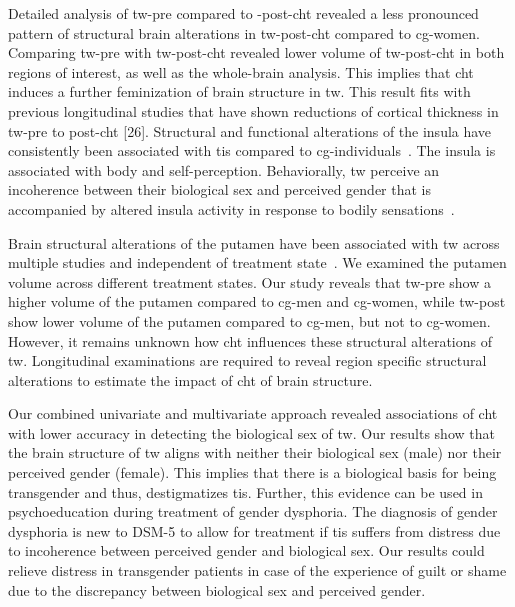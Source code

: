 \documentclass{article}
\begin{document}
    Detailed analysis of \ac{tw}-pre compared to -post-\ac{cht} revealed a less pronounced pattern of structural brain alterations in \ac{tw}-post-\ac{cht} compared to \ac{cg}-women. Comparing \ac{tw}-pre with \ac{tw}-post-\ac{cht} revealed lower volume of \ac{tw}-post-\ac{cht} in both regions of interest, as well as the whole-brain analysis. This implies that \ac{cht} induces a further feminization of brain structure in \ac{tw}. This result fits with previous longitudinal studies that have shown reductions of cortical thickness in \ac{tw}-pre to post-\ac{cht} [26]. Structural and functional alterations of the insula have consistently been associated with \acp{ti} compared to \ac{cg}-individuals~\cite{Spizzirri2018, Savic2011, Kranz2015, Burke2018, Manzouri2019}. The insula is associated with body and self-perception. Behaviorally, \ac{tw} perceive an incoherence between their biological sex and perceived gender that is accompanied by altered insula activity in response to bodily sensations~\cite{Case2017}.

    Brain structural alterations of the putamen have been associated with \ac{tw} across multiple studies and independent of treatment state~\cite{Savic2011,Luders2009,Mueller2017}. We examined the putamen volume across different treatment states. Our study reveals that \ac{tw}-pre show a higher volume of the putamen compared to \ac{cg}-men and \ac{cg}-women, while \ac{tw}-post show lower volume of the putamen compared to \ac{cg}-men, but not to \ac{cg}-women. However, it remains unknown how \ac{cht} influences these structural alterations of \ac{tw}. Longitudinal examinations are required to reveal region specific structural alterations to estimate the impact of \ac{cht} of brain structure.

    Our combined univariate and multivariate approach revealed associations of \ac{cht} with lower accuracy in detecting the biological sex of \ac{tw}. Our results show that the brain structure of \ac{tw} aligns with neither their biological sex (male) nor their perceived gender (female). This implies that there is a biological basis for being transgender and thus, destigmatizes \acp{ti}. Further, this evidence can be used in psychoeducation during treatment of gender dysphoria. The diagnosis of gender dysphoria is new to DSM-5 to allow for treatment if \acp{ti} suffers from distress due to incoherence between perceived gender and biological sex. Our results could relieve distress in transgender patients in case of the experience of guilt or shame due to the discrepancy between biological sex and perceived gender.
\end{document}

